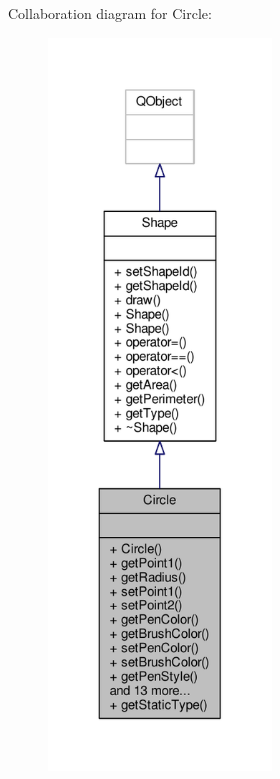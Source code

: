 Collaboration diagram for Circle\+:\nopagebreak
\begin{figure}[H]
\begin{center}
\leavevmode
\includegraphics[height=550pt]{classCircle__coll__graph}
\end{center}
\end{figure}
